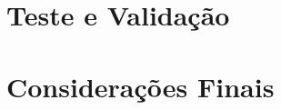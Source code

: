 \documentclass[]{politex}
\begin{document}
\part{Teste e Validação}





\part{Considerações Finais}





%






\apendice



\anexo


\end{document}
